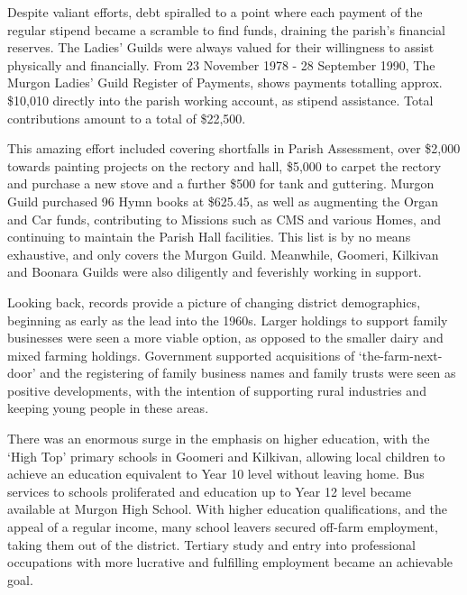 Despite valiant efforts, debt spiralled to a point where each payment of the regular stipend became a scramble to find funds, draining the parish's financial reserves. The Ladies' Guilds were always valued for their willingness to assist physically and financially. From 23 November 1978 - 28 September 1990, The Murgon Ladies' Guild Register of Payments, shows payments totalling approx. \$10,010 directly into the parish working account, as stipend assistance. Total contributions amount to a total of \$22,500.



This amazing effort included covering shortfalls in Parish Assessment, over \$2,000 towards painting projects on the rectory and hall, \$5,000 to carpet the rectory and purchase a new stove and a further \$500 for tank and guttering. Murgon Guild purchased 96 Hymn books at \$625.45, as well as augmenting the Organ and Car funds, contributing to Missions such as CMS and various Homes, and continuing to maintain the Parish Hall facilities. This list is by no means exhaustive, and only covers the Murgon Guild. Meanwhile, Goomeri, Kilkivan and Boonara Guilds were also diligently and feverishly working in support.



Looking back, records provide a picture of changing district demographics, beginning as early as the lead into the 1960s. Larger holdings to support family businesses were seen a more viable option, as opposed to the smaller dairy and mixed farming holdings. Government supported acquisitions of `the-farm-next-door' and the registering of family business names and family trusts were seen as positive developments, with the intention of supporting rural industries and keeping young people in these areas.



There was an enormous surge in the emphasis on higher education, with the `High Top' primary schools in Goomeri and Kilkivan, allowing local children to achieve an education equivalent to Year 10 level without leaving home. Bus services to schools proliferated and education up to Year 12 level became available at Murgon High School. With higher education qualifications, and the appeal of a regular income, many school leavers secured off-farm employment, taking them out of the district. Tertiary study and entry into professional occupations with more lucrative and fulfilling employment became an achievable goal.



